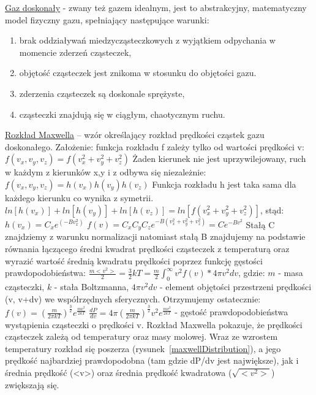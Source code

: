 \underline{Gaz doskonały} - zwany też gazem idealnym, jest to abstrakcyjny, matematyczny model fizyczny gazu, spełniający następujące warunki: 

\begin{enumerate}[-]
	\item brak oddziaływań miedzycząsteczkowych z wyjątkiem odpychania w momencie zderzeń cząsteczek,
	\item objętość cząsteczek jest znikoma w stosunku do objętości gazu.
	\item zderzenia cząsteczek są doskonale sprężyste,
	\item cząsteczki znajdują się w ciągłym, chaotycznym ruchu.
\end{enumerate}

\underline{Rozkład Maxwella} – wzór określający rozkład prędkości cząstek gazu doskonałego. Założenie:  funkcja rozkładu f zależy tylko od wartości prędkości v:\newline
$ f(v_x,v_y,v_z) = f(v_x^2+v_y^2+v_z^2) $\newline
Żaden kierunek nie jest uprzywilejowany, ruch w każdym z kierunków x,y i z odbywa się niezależnie:\newline
$ f(v_x,v_y,v_z) = h(v_x)h(v_y)h(v_z) $\newline
Funkcja rozkładu h jest taka sama dla każdego kierunku co wynika z symetrii.\newline
$ ln[h(v_x)] + ln[h(v_y)] + ln[h(v_z)] = ln[f(v_x^2+v_y^2+v_z^2)] $, stąd:\newline
$ h(v_x) = C_xe^{(-Bv_x^2)} $\newline
$ f(v) = C_xC_yC_ze^{-B(v_x^2+v_y^2+v_z^2)} = Ce^{-Bv^2} $\newline
Stałą C znajdziemy z warunku normalizacji natomiast stałą B znajdujemy na podstawie równania łączącego średni kwadrat prędkości cząsteczek z temperaturą oraz wyrazić wartość średnią kwadratu prędkości poprzez funkcję gęstości prawdopodobieństwa:\newline
$ \frac{m<v^2>}{2} = \frac{3}{2}kT = \frac{m}{2}\int_{0}^{\infty} v^2f(v)*4\pi v^2dv $, gdzie:
$ m $ - masa cząsteczki,\newline
$ k $ - stała Boltzmanna,\newline
$ 4\pi v^2dv $ - element objętości przestrzeni prędkości (v, v+dv) we współrzędnych sferycznych.\newline
Otrzymujemy ostatecznie:\newline
$ f(v) = (\frac{m}{2\pi kT})^{\frac{3}{2}}e^{\frac{mv^2}{2kT}} $\newline
$ \frac{dP}{dv} = 4\pi (\frac{m}{2\pi kT})^{\frac{3}{2}}v^2e^{\frac{mv^2}{2kT}} $ - gęstość prawdopodobieństwa wystąpienia cząsteczki o prędkości v.\newline
Rozkład Maxwella pokazuje, że prędkości cząsteczek zależą od temperatury oraz masy molowej. Wraz ze wzrostem temperatury rozkład się poszerza (rysunek~\ref{maxwellDistribution}), a jego prędkość najbardziej prawdopodobna (tam gdzie dP/dv jest największe), jak i średnia prędkość (<v>) oraz średnia prędkość kwadratowa ($ \sqrt{<v^2>} $) zwiększają się.

